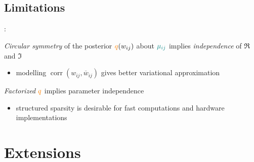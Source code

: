 \documentclass{beamer}
\newcommand{\cplx}{\mathbb{C}}
\newcommand{\conj}[1]{\overline{#1}}
\newcommand{\iu}{{\jmath}}
\begin{document}

\subsection{Limitations} %
\label{sec:limitations}

\begin{frame}[c]{\insertsection: \insertsubsection}

  \emph{Circular symmetry} of the posterior ${\color{orange} q}(w_{ij})$ about
  ${\color{teal} \mu_{ij}}$ implies \emph{independence} of $\Re$ and $\Im$
  \begin{itemize}
    \item modelling $
      \mathop{corr}(w_{ij}, \conj{w}_{ij})
    $ gives better variational approximation
  \end{itemize}

  \bigskip

  \bigskip
  \emph{Factorized} ${\color{orange} q}$ implies parameter independence %
  \begin{itemize}
    \item structured sparsity is desirable for fast computations and hardware implementations
  \end{itemize}


  
\end{frame}



\section{Extensions} %
\label{sec:extensions}
\end{document}
